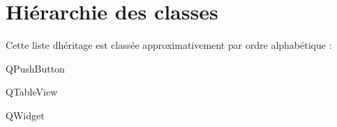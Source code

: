 \section{Hiérarchie des classes}
Cette liste d\textquotesingle{}héritage est classée approximativement par ordre alphabétique \+:\begin{DoxyCompactList}
\item Q\+Push\+Button\begin{DoxyCompactList}
\item {}
\end{DoxyCompactList}
\item Q\+Table\+View\begin{DoxyCompactList}
\item {}
\end{DoxyCompactList}
\item Q\+Widget\begin{DoxyCompactList}
\item {}
\begin{DoxyCompactList}
\item {}
\item {}
\end{DoxyCompactList}
\end{DoxyCompactList}
\item {}
\item {}
\item {}
\end{DoxyCompactList}
